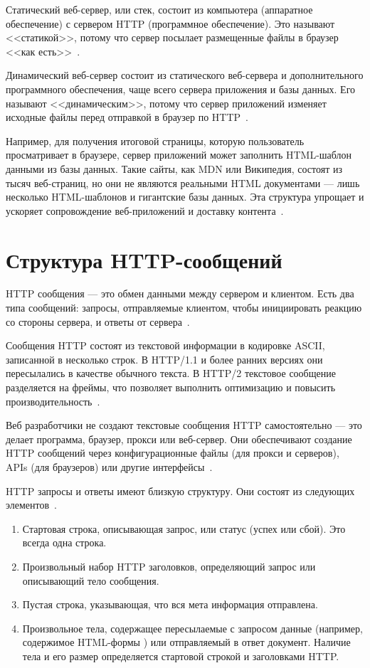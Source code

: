 \documentclass{bmstu}
\begin{document}
Статический веб-сервер, или стек, состоит из компьютера (аппаратное обеспечение) с сервером HTTP (программное обеспечение). 
Это называют <<статикой>>, потому что сервер посылает размещенные файлы в браузер <<как есть>>~\cite{MdnWebServer2023}.

Динамический веб-сервер состоит из статического веб-сервера и дополнительного программного обеспечения, чаще всего сервера приложения и базы данных. 
Его называют <<динамическим>>, потому что сервер приложений изменяет исходные файлы перед отправкой в браузер по HTTP~\cite{MdnWebServer2023}.

Например, для получения итоговой страницы, которую пользователь просматривает в браузере, сервер приложений может заполнить HTML-шаблон данными из базы данных. 
Такие сайты, как MDN или Википедия, состоят из тысяч веб-страниц, но они не являются реальными HTML документами --- лишь несколько HTML-шаблонов и гигантские базы данных. 
Эта структура упрощает и ускоряет сопровождение веб-приложений и доставку контента~\cite{MdnWebServer2023}.

\section{Структура HTTP-сообщений}

HTTP сообщения --- это обмен данными между сервером и клиентом. 
Есть два типа сообщений: запросы, отправляемые клиентом, чтобы инициировать реакцию со стороны сервера, и ответы от сервера~\cite{MdnHttpMsg2023}.

Сообщения HTTP состоят из текстовой информации в кодировке ASCII, записанной в несколько строк. 
В HTTP/1.1 и более ранних версиях они пересылались в качестве обычного текста. 
В HTTP/2 текстовое сообщение разделяется на фреймы, что позволяет выполнить оптимизацию и повысить производительность~\cite{MdnHttpMsg2023}.

Веб разработчики не создают текстовые сообщения HTTP самостоятельно --- это делает программа, браузер, прокси или веб-сервер. 
Они обеспечивают создание HTTP сообщений через конфигурационные файлы (для прокси и серверов), APIs (для браузеров) или другие интерфейсы~\cite{MdnHttpMsg2023}.

HTTP запросы и ответы имеют близкую структуру. 
Они состоят из следующих элементов~\cite{MdnHttpMsg2023}.
\begin{enumerate}
\item Стартовая строка, описывающая запрос, или статус (успех или сбой). 
Это всегда одна строка.
\item Произвольный набор HTTP заголовков, определяющий запрос или описывающий тело сообщения.
\item Пустая строка, указывающая, что вся мета информация отправлена.
\item Произвольное тела, содержащее пересылаемые с запросом данные (например, содержимое HTML-формы ) или отправляемый в ответ документ. 
Наличие тела и его размер определяется стартовой строкой и заголовками HTTP.
\end{enumerate}
\end{document}
